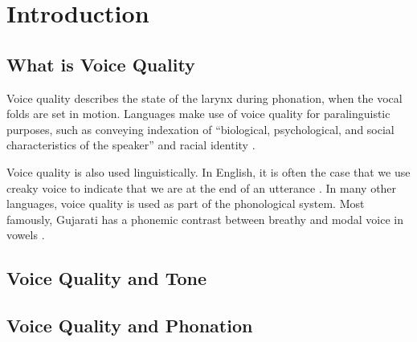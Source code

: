 
\chapter{Introduction} \label{chap:introduction}


\section{What is Voice Quality} \label{sec:voice_quality}
Voice quality describes the state of the larynx during phonation, when the vocal folds are set in motion. Languages make use of voice quality for paralinguistic purposes, such as conveying indexation of ``biological, psychological, and social characteristics of the speaker'' \citep{laverVoiceQualityIndexical1968} and racial identity \citep{podesvaStanceWindowLanguageRace2016}. 

Voice quality is also used linguistically. In English, it is often the case that we use creaky voice to indicate that we are at the end of an utterance \citep[e.g.,][]{garellekProductionPerceptionGlottal2013}. In many other languages, voice quality is used as part of the phonological system. Most famously, Gujarati has a phonemic contrast between breathy and modal voice in vowels \citep[e.g.,][]{fischer-jorgensenPhoneticAnalysisBreathy1968,espositoContrastiveBreathinessConsonants2012, khanPhoneticsContrastivePhonation2012,espositoDistinguishingBreathyConsonants2019}. 

\citet{espositoCrossLinguisticPatterns2020}

\section{Voice Quality and Tone} \label{sec:voice_quality_and_tone}

\section{Voice Quality and Phonation} \label{sec:voice_quality_and_phonation}

